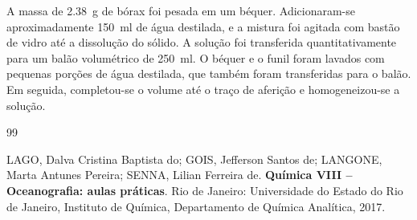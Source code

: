 \documentclass[a4paper,12pt]{article}
\begin{document}
A massa de \qty{2.38}{\gram} de bórax foi pesada em um béquer. Adicionaram-se aproximadamente \qty{150}{\milli\litre} de água destilada, e a mistura foi agitada com bastão de vidro até a dissolução do sólido. A solução foi transferida quantitativamente para um balão volumétrico de \qty{250}{\milli\litre}. O béquer e o funil foram lavados com pequenas porções de água destilada, que também foram transferidas para o balão. Em seguida, completou-se o volume até o traço de aferição e homogeneizou-se a solução.

%

\newpage
{}
{}
\begin{thebibliography}{99}

LAGO, Dalva Cristina Baptista do;
GOIS, Jefferson Santos de;
LANGONE, Marta Antunes Pereira;
SENNA, Lilian Ferreira de.
\textbf{Química VIII -- Oceanografia: aulas práticas}.
Rio de Janeiro: Universidade do Estado do Rio de Janeiro, Instituto de Química, Departamento de Química Analítica, 2017.

\end{thebibliography}
\end{document}
